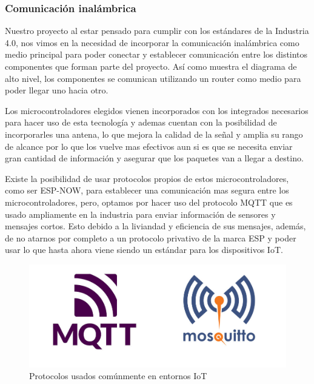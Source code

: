 \subsubsection{Comunicación inalámbrica}

Nuestro proyecto al estar pensado para cumplir con los estándares de la Industria 4.0, nos vimos en la necesidad de incorporar la comunicación inalámbrica como medio principal para poder conectar y establecer comunicación entre los distintos componentes que forman parte del proyecto. Así como muestra el diagrama de alto nivel, los componentes se comunican utilizando un router como medio para poder llegar uno hacia otro.

Los microcontroladores elegidos vienen incorporados con los integrados necesarios para hacer uso de esta tecnología y ademas cuentan con la posibilidad de incorporarles una antena, lo que mejora la calidad de la señal y amplia su rango de alcance por lo que los vuelve mas efectivos aun si es que se necesita enviar gran cantidad de información y asegurar que los paquetes van a llegar a destino.

Existe la posibilidad de usar protocolos propios de estos microcontroladores, como ser ESP-NOW, para establecer una comunicación mas segura entre los microcontroladores, pero, optamos por hacer uso del protocolo MQTT que es usado ampliamente en la industria para enviar información de sensores y mensajes cortos. Esto debido a la liviandad y eficiencia de sus mensajes, además, de no atarnos por completo a un protocolo privativo de la marca ESP y poder usar lo que hasta ahora viene siendo un estándar para los dispositivos IoT.

\begin{figure}[H]
   \centering
   \includegraphics[width=0.7\linewidth]{images/com_inalambrica.jpg}
   \caption{Protocolos usados comúnmente en entornos IoT}
   \label{fig:mqtt}
\end{figure}